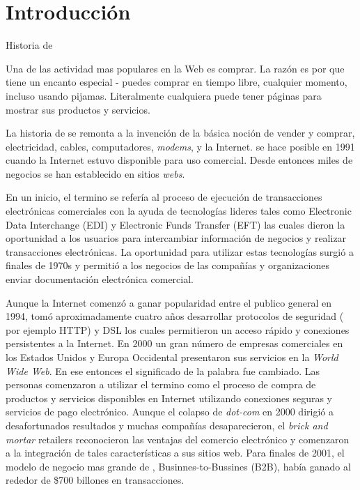 \chapter{Introducción}\label{cap:intro}

Historia de \ecommerce

Una de las actividad mas populares en la Web es comprar. La razón es por que tiene un encanto especial - puedes comprar en tiempo libre, cualquier momento, incluso usando pijamas. Literalmente cualquiera puede tener páginas para mostrar sus productos y servicios.

La historia de \ecommerce se remonta a la invención de la básica noción de \“vender y comprar\”, electricidad, cables, computadores, \textit{modems}, y la Internet. \ecommerce se hace posible en 1991 cuando la Internet estuvo disponible para uso comercial. Desde entonces miles de negocios se han establecido en sitios \textit{webs}.

En un inicio, el termino \ecommerce se refería al proceso de ejecución  de transacciones electrónicas comerciales con la ayuda de tecnologías lideres tales como Electronic Data Interchange (EDI) y Electronic Funds Transfer (EFT) las cuales dieron la oportunidad a los usuarios para intercambiar información de negocios y realizar transacciones electrónicas. La oportunidad para utilizar estas tecnologías surgió a finales de 1970s y permitió a los negocios de las compañías y organizaciones enviar documentación electrónica comercial.

Aunque la Internet comenzó a ganar popularidad  entre el publico general en 1994, tomó aproximadamente cuatro años desarrollar protocolos de seguridad ( por ejemplo HTTP) y DSL los cuales permitieron un acceso rápido y conexiones persistentes a la Internet. En 2000 un gran número de empresas comerciales en los Estados Unidos y Europa Occidental presentaron sus servicios en la \textit{World Wide Web}. En ese entonces el significado de la palabra \ecommerce fue cambiado. Las personas comenzaron a utilizar el termino \ecommerce como el proceso de compra de productos y servicios disponibles en Internet utilizando conexiones seguras y servicios de pago electrónico. Aunque el colapso de \textit{dot-com} en 2000 dirigió a desafortunados resultados y muchas compañías \ecommerce desaparecieron, el \textit{brick and mortar} retailers reconocieron las ventajas del comercio electrónico y comenzaron a la integración de tales características a sus sitios web. Para finales de 2001, el modelo de negocio mas grande de \ecommerce, Businnes-to-Bussines (B2B), había ganado al rededor de \$700 billones en transacciones.

